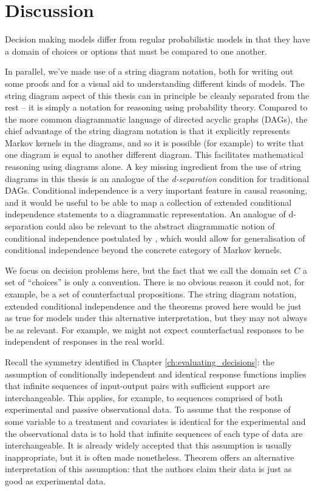 

\chapter{Discussion}\label{ch:discussion}

Decision making models differ from regular probabilistic models in that they have a domain of choices or options that must be compared to one another. 

In parallel, we've made use of a string diagram notation, both for writing out some proofs and for a visual aid to understanding different kinds of models. The string diagram aspect of this thesis can in principle be cleanly separated from the rest -- it is simply a notation for reasoning using probability theory. Compared to the more common diagrammatic language of directed acyclic graphs (DAGs), the chief advantage of the string diagram notation is that it explicitly represents Markov kernels in the diagrams, and so it is possible (for example) to write that one diagram is equal to another different diagram. This facilitates mathematical reasoning using diagrams alone. A key missing ingredient from the use of string diagrams in this thesis is an analogue of the \emph{d-separation} condition for traditional DAGs. Conditional independence is a very important feature in causal reasoning, and it would be useful to be able to map a collection of extended conditional independence statements to a diagrammatic representation. An analogue of d-separation could also be relevant to the abstract diagrammatic notion of conditional independence postulated by \citet{fritz_synthetic_2020}, which would allow for generalisation of conditional independence beyond the concrete category of Markov kernels.

We focus on decision problems here, but the fact that we call the domain set $C$ a set of ``choices'' is only a convention. There is no obvious reason it could not, for example, be a set of counterfactual propositions. The string diagram notation, extended conditional independence and the theorems proved here would be just as true for models under this alternative interpretation, but they may not always be as relevant. For example, we might not expect counterfactual responses to be independent of responses in the real world.

Recall the symmetry identified in Chapter \ref{ch:evaluating_decisions}: the assumption of conditionally independent and identical response functions implies that infinite sequences of input-output pairs with sufficient support are interchangeable. This applies, for example, to sequences comprised of both experimental and passive observational data. To assume that the response of some variable to a treatment and covariates is identical for the experimental and the observational data is to hold that infinite sequences of each type of data are interchangeable. It is already widely accepted that this assumption is usually inappropriate, but it is often made nonetheless. Theorem  offers an alternative interpretation of this assumption: that the authors claim their data is just as good as experimental data.

